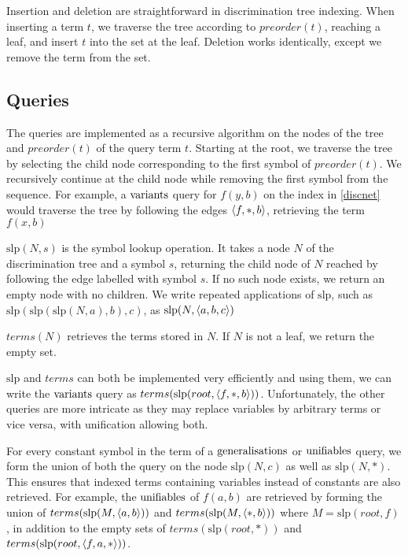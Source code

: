 Insertion and deletion are straightforward in discrimination tree indexing. When inserting a term $t$, we traverse the tree according to $preorder(t)$, reaching a leaf, and insert $t$ into the set at the leaf. Deletion works identically, except we remove the term from the set.

\subsection{Queries}
The queries are implemented as a recursive algorithm on the nodes of the tree and $preorder(t)$ of the query term $t$. Starting at the root, we traverse the tree by selecting the child node corresponding to the first symbol of $preorder(t)$. We recursively continue at the child node while removing the first symbol from the sequence. For example, a $\mathrm{variants}$ query for $f(y,b)$ on the index in \cref{discnet} would traverse the tree by following the edges $\langle f,*,b \rangle$, retrieving the term $f(x,b)$

\newcommand{\slp}{\mathrm{slp}}
\begin{defn}
  $\slp(N,s)$ is the symbol lookup operation. It takes a node $N$ of the discrimination tree and a symbol $s$, returning the child node of $N$ reached by following the edge labelled with symbol $s$. If no such node exists, we return an empty node with no children. We write repeated applications of $\slp$, such as $\slp(\slp(\slp(N,a),b),c)$, as $\slp(N, \ang{a,b,c})$
\end{defn}
\begin{defn}
  $terms(N)$ retrieves the terms stored in $N$. If $N$ is not a leaf, we return the empty set.
\end{defn}


$\slp$ and $terms$ can both be implemented very efficiently and using them, we can write the $\mathrm{variants}$ query as $terms(\slp(root,\ang{f,*,b}))$. Unfortunately, the other queries are more intricate as they may replace variables by arbitrary terms or vice versa, with unification allowing both.

For every constant symbol in the term of a $\mathrm{generalisations}$ or $\mathrm{unifiables}$ query, we form the union of both the query on the node $\slp(N,c)$ as well as $\slp(N,*)$. This ensures that indexed terms containing variables instead of constants are also retrieved. For example, the $\mathrm{unifiables}$ of $f(a,b)$ are retrieved by forming the union of $terms(\slp(M,\ang{a,b}))$ and $terms(\slp(M,\ang{*,b}))$ where $M = \slp(root,f)$, in addition to the empty sets of $terms(\slp(root,*))$ and $terms(\slp(root,\ang{f,a,*}))$.

